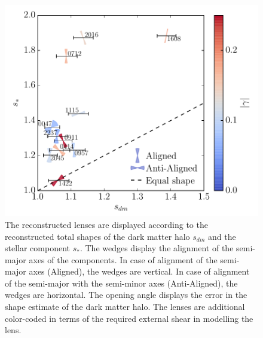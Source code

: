 \documentclass[useAMS,usenatbib]{mn2e}
\begin{document}
\begin{figure}
  \centering
  \includegraphics[width=\linewidth]{Figures/wedges_shears.pdf}
  \caption[width=.65\linewidth]{The reconstructed lenses are displayed according to the reconstructed total shapes of the dark matter halo $s_{dm}$ and the stellar component $s_{*}$. The wedges display the alignment of the semi-major axes of the components. In case of alignment of the semi-major axes (Aligned), the wedges are vertical. In case of alignment of the semi-major with the semi-minor axes (Anti-Aligned), the wedges are horizontal. The opening angle displays the error in the shape estimate of the dark matter halo. The lenses are additional color-coded in terms of the required external shear in modelling the lens.}
  \label{fig:wedges}
\end{figure}
\end{document}
